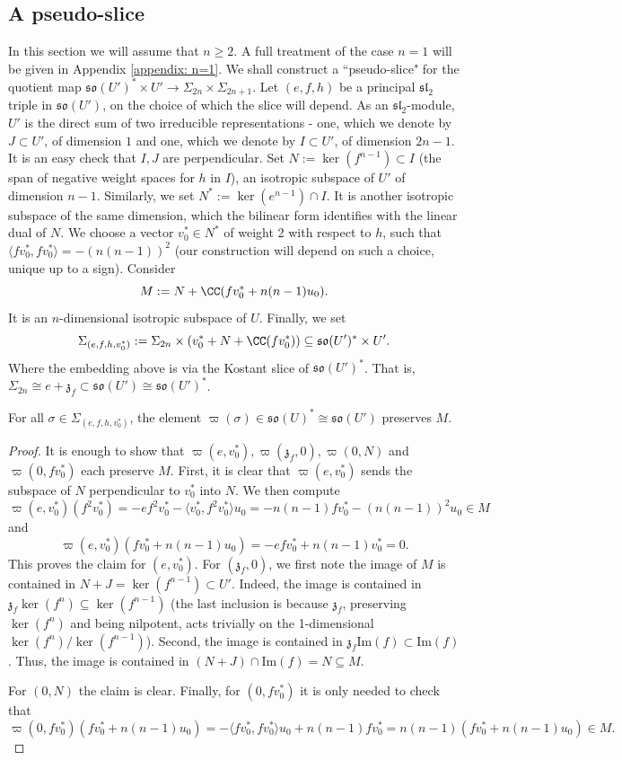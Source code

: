 \documentclass[11pt]{article}
\begin{document}
\subsection{A pseudo-slice}\label{sec: pseudo-slice}
In this section we will assume that $n\geq 2$.
A full treatment of the case $n=1$ will be given in Appendix \ref{appendix: n=1}.
We shall construct a ``pseudo-slice" for the quotient map $\mathfrak{so}(U')^*\times U' \to \Sigma_{2n}\times \Sigma_{2n+1}$. Let $(e,f,h)$ be a principal $\mathfrak{sl}_2$ triple in $\mathfrak{so}(U')$, on the choice of which the slice will depend. As an $\mathfrak{sl}_2$-module, $U'$ is the direct sum of two irreducible representations - one, which we denote by $J\subset U'$, of dimension $1$ and one, which we denote by $I\subset U'$, of dimension $2n-1$. It is an easy check that $I,J$ are perpendicular.
Set $N:=\ker(f^{n-1})\subset I$ (the span of negative weight spaces for $h$ in $I$), an isotropic subspace of $U'$ of dimension $n-1$. Similarly, we set $N^*:=\ker(e^{n-1})\cap I$. It is another isotropic subspace of the same dimension, which the bilinear form identifies with the linear dual of $N$.
We choose a vector $v_0^*\in N^*$ of weight 2 with respect to $h$, such that $\langle fv_0^*, fv_0^*\rangle=-(n(n-1))^2$
(our construction will depend on such a choice, unique up to a sign). Consider $$M:=N + \CC(fv_0^* + n(n-1) u_0).$$ It is an $n$-dimensional isotropic subspace of $U$.
Finally, we set $$\Sigma_{(e, f, h, v_0^*)}:= \Sigma_{2n}\times (v_0^* + N + \CC(fv_0^*))\subseteq \mathfrak{so}(U')^*\times U'.$$
Where the embedding above is via the Kostant slice of $\mathfrak{so}(U')^*$. That is, $\Sigma_{2n}\cong e+\mathfrak{z}_f\subset \mathfrak{so}(U')\cong \mathfrak{so}(U')^*$.
\begin{claim}
    For all $\sigma\in \Sigma_{(e, f, h, v_0^*)}$, the element $\varpi(\sigma)\in \mathfrak{so}(U)^*\cong \mathfrak{so}(U')$ preserves $M$.
\end{claim}
\begin{proof}
    It is enough to show that $\varpi(e,v_0^*), \varpi(\mathfrak{z}_f, 0),\varpi(0, N)$ and $\varpi(0,fv_0^*)$ each preserve $M$.
    First, it is clear that $\varpi(e, v_0^*)$ sends the subspace of $N$ perpendicular to $v_0^*$ into $N$. We then compute
    $$\varpi(e, v_0^*)(f^2v_0^*) = -ef^2v_0^* - \langle v_0^*, f^2v_0^*\rangle u_0 = -n(n-1)fv_0^* - (n(n-1))^2u_0\in M$$
    and
    $$\varpi(e, v_0^*)(fv_0^* + n(n-1) u_0) = -efv_0^* + n(n-1)v_0^* = 0.$$
    This proves the claim for $(e, v_0^*)$.
    For $(\mathfrak{z}_f, 0)$, we first note the image of $M$ is contained in $N+J=\ker(f^{n-1})\subset U'$. Indeed, the image is contained in $\mathfrak{z}_f \ker(f^n)\subseteq \ker(f^{n-1})$ (the last inclusion is because $\mathfrak{z}_f$, preserving $\ker(f^n)$ and being nilpotent, acts trivially on the 1-dimensional $\ker(f^n)/\ker(f^{n-1})$). Second, the image is contained in $\mathfrak{z}_f \mathrm{Im}(f)\subset \mathrm{Im}(f)$. Thus, the image is contained in $(N+J)\cap \mathrm{Im}(f) = N\subseteq M$.

    For $(0,N)$ the claim is clear.
    Finally, for $(0,fv_0^*)$ it is only needed to check that
    $$\varpi(0,fv_0^*)(fv_0^*+n(n-1)u_0) = -\langle fv_0^*, fv_0^* \rangle u_0 + n(n-1) fv_0^* = n(n-1)(fv_0^* + n(n-1)u_0)\in M.$$
\end{proof}
\end{document}
